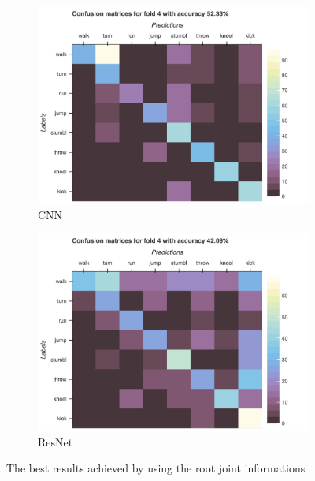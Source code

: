 		\begin{figure}[H]\ContinuedFloat
			\begin{subfigure}[b]{0.49\textwidth}
				\centering
				\includegraphics[width=\textwidth]{img/CNN-confusion_matrix.png}
				\caption{CNN}
			\end{subfigure}
			\hfill
			\begin{subfigure}[b]{0.49\textwidth}
				\centering
				\includegraphics[width=\textwidth]{img/ResNet-confusion_matrix.png}
				\caption{ResNet}
			\end{subfigure}
			\caption{The best results achieved by using the root joint informations}
			\label{fig:confusion-raw}
		\end{figure}
